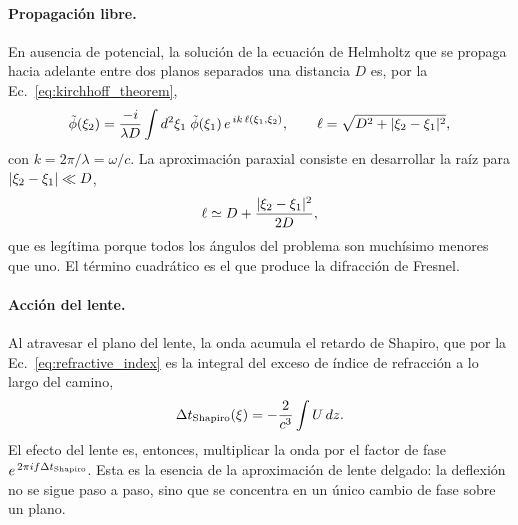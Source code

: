 \documentclass[11pt,a4paper,openany]{book}
\begin{document}
\paragraph{Propagaci\'on libre.} En ausencia de potencial, la soluci\'on de la
ecuaci\'on de Helmholtz que se propaga hacia adelante entre dos planos
separados una distancia $D$ es, por la Ec.~\eqref{eq:kirchhoff_theorem},
\begin{equation}
  \tilde\phi(\vb\xi_2)=\frac{-i}{\lambda D}\int d^{2}\vb\xi_1\;
  \tilde\phi(\vb\xi_1)\,e^{\,ik\,\ell(\vb\xi_1,\vb\xi_2)},
  \qquad
  \ell=\sqrt{D^{2}+|\vb\xi_2-\vb\xi_1|^{2}} ,
  \label{eq:kirchhoff}
\end{equation}
con $k=2\pi/\lambda=\omega/c$. La aproximaci\'on paraxial consiste en
desarrollar la ra\'iz para $|\vb\xi_2-\vb\xi_1|\ll D$,
\begin{equation}
  \ell\simeq D+\frac{|\vb\xi_2-\vb\xi_1|^{2}}{2D} ,
  \label{eq:paraxial_expansion}
\end{equation}
que es leg\'itima porque todos los \'angulos del problema son much\'isimo
menores que uno. El t\'ermino cuadr\'atico es el que produce la difracci\'on de
Fresnel.

\paragraph{Acci\'on del lente.} Al atravesar el plano del lente, la onda
acumula el retardo de Shapiro, que por la Ec.~\eqref{eq:refractive_index} es
la integral del exceso de \'indice de refracci\'on a lo largo del camino,
\begin{equation}
  \Delta t_{\rm Shapiro}(\vb\xi)=-\frac{2}{c^{3}}\int U\,dz .
  \label{eq:shapiro}
\end{equation}
El efecto del lente es, entonces, multiplicar la onda por el factor de fase
$e^{\,2\pi i f\Delta t_{\rm Shapiro}}$. Esta es la esencia de la aproximaci\'on
de lente delgado: la deflexi\'on no se sigue paso a paso, sino que se
concentra en un \'unico cambio de fase sobre un plano.
\end{document}
